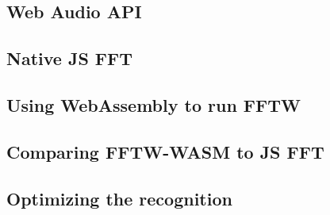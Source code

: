 \subsection{Web Audio API}
\subsection{Native JS FFT}
\subsection{Using WebAssembly to run FFTW}
\subsection{Comparing FFTW-WASM to JS FFT}
\subsection{Optimizing the recognition}